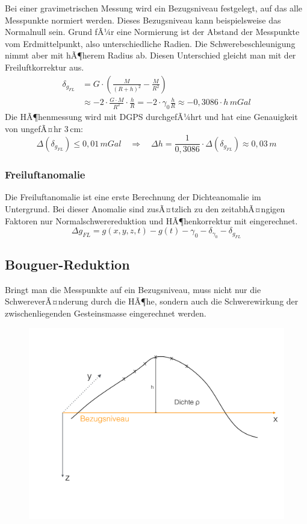 Bei einer gravimetrischen Messung wird ein Bezugsniveau festgelegt, auf das alle Messpunkte normiert werden. Dieses Bezugsniveau kann beispielsweise das Normalnull sein. Grund fÃ¼r eine Normierung ist der Abstand der Messpunkte vom Erdmittelpunkt, also unterschiedliche Radien. Die Schwerebeschleunigung nimmt aber mit hÃ¶herem Radius ab. Diesen Unterschied gleicht man mit der Freiluftkorrektur aus. \begin{align*}
	\delta_{g_{FL}} &= G \cdot \left( \frac{M}{(R + h)^2} - \frac{M}{R^2} \right) \\
	&\approx -2 \cdot \frac{G \cdot M}{R^2} \cdot \frac{h}{R} = -2 \cdot \gamma_0 \frac{h}{R} \approx -0,3086 \cdot h\,\si{m Gal}
\end{align*}
Die HÃ¶henmessung wird mit DGPS durchgefÃ¼hrt und hat eine Genauigkeit von ungefÃ¤hr 3\,cm: \begin{equation*}
	\Delta (\delta_{g_{FL}}) \leq 0,01\,\si{m Gal} \quad \Rightarrow \quad \Delta h = \frac{1}{0,3086} \cdot \Delta (\delta_{g_{FL}}) \approx 0,03\,\si{m}
\end{equation*}
\subsubsection{Freiluftanomalie} 
Die Freiluftanomalie ist eine erste Berechnung der Dichteanomalie im Untergrund. Bei dieser Anomalie sind zusÃ¤tzlich zu den zeitabhÃ¤ngigen Faktoren nur Normalschwerereduktion und HÃ¶henkorrektur mit eingerechnet. \begin{equation*}
	\Delta g_{FL} = g(x, y, z, t) - g(t) - \gamma_0 - \delta_{\gamma_0} - \delta_{g_{FL}}
\end{equation*}

\subsection{Bouguer-Reduktion}
Bringt man die Messpunkte auf ein Bezugsniveau, muss nicht nur die SchwereverÃ¤nderung durch die HÃ¶he, sondern auch die Schwerewirkung der zwischenliegenden Gesteinsmasse eingerechnet werden. 

\begin{figure}[H]
	\centering
	\includegraphics[width = \textwidth]{GravimetrieBilder/Bouguer-Reduktion1}
\end{figure}

